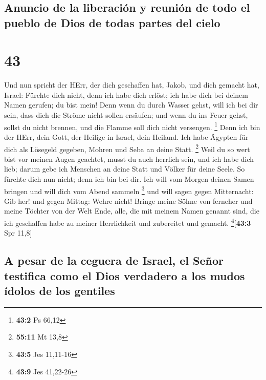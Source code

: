 \hypertarget{anuncio-de-la-liberaciuxf3n-y-reuniuxf3n-de-todo-el-pueblo-de-dios-de-todas-partes-del-cielo}{%
\subsection{Anuncio de la liberación y reunión de todo el pueblo de Dios
de todas partes del
cielo}\label{anuncio-de-la-liberaciuxf3n-y-reuniuxf3n-de-todo-el-pueblo-de-dios-de-todas-partes-del-cielo}}

\hypertarget{section-42}{%
\section{43}\label{section-42}}

 Und nun spricht der HErr, der dich geschaffen hat, Jakob,
und dich gemacht hat, Israel: Fürchte dich nicht, denn ich habe dich
erlöst; ich habe dich bei deinem Namen gerufen; du bist mein!
 Denn wenn du durch Wasser gehst, will ich bei dir sein,
dass dich die Ströme nicht sollen ersäufen; und wenn du ins Feuer gehst,
sollst du nicht brennen, und die Flamme soll dich nicht versengen.
\footnote{\textbf{43:2} Ps 66,12}  Denn ich bin der HErr,
dein Gott, der Heilige in Israel, dein Heiland. Ich habe Ägypten für
dich als Lösegeld gegeben, Mohren und Seba an deine Statt. \footnote{\textbf{55:11}
  Mt 13,8}  Weil du so wert bist vor meinen Augen
geachtet, musst du auch herrlich sein, und ich habe dich lieb; darum
gebe ich Menschen an deine Statt und Völker für deine Seele.
 So fürchte dich nun nicht; denn ich bin bei dir. Ich will
vom Morgen deinen Samen bringen und will dich vom Abend sammeln
\footnote{\textbf{43:5} Jes 11,11-16}  und will sagen
gegen Mitternacht: Gib her! und gegen Mittag: Wehre nicht! Bringe meine
Söhne von ferneher und meine Töchter von der Welt Ende, 
alle, die mit meinem Namen genannt sind, die ich geschaffen habe zu
meiner Herrlichkeit und zubereitet und gemacht.
\footnote{\textbf{43:9} Jes 41,22-26}{[}\textbf{43:3} Spr 11,8{]}

\hypertarget{a-pesar-de-la-ceguera-de-israel-el-seuxf1or-testifica-como-el-dios-verdadero-a-los-mudos-uxeddolos-de-los-gentiles}{%
\subsection{A pesar de la ceguera de Israel, el Señor testifica como el
Dios verdadero a los mudos ídolos de los
gentiles}\label{a-pesar-de-la-ceguera-de-israel-el-seuxf1or-testifica-como-el-dios-verdadero-a-los-mudos-uxeddolos-de-los-gentiles}}

